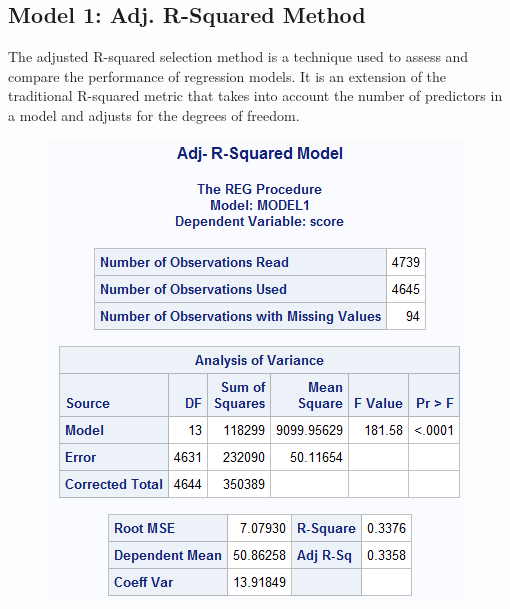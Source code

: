 \documentclass[12pt]{article}
\begin{document}
\subsection{Model 1: Adj. R-Squared Method}
The adjusted R-squared selection method is a technique used to assess and compare the performance of regression models. It is an extension of the traditional R-squared metric that takes into account the number of predictors in a model and adjusts for the degrees of freedom.
\begin{figure}[h]
    \centering
    \begin{minipage}[t]{0.4\textwidth}
        \vspace{10pt}
        \centering
        \includegraphics[width=\textwidth]{images/model1_a.png}
        \label{fig:unemp_dist}
    \end{minipage}\hfill
    \begin{minipage}[t]{0.55\textwidth}
        \vspace{0pt}
        \centering

\end{minipage}
\end{figure}
\end{document}
